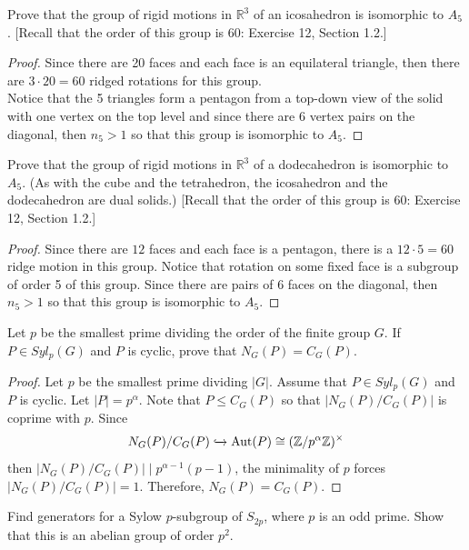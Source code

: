 \documentclass{article}
\newcommand{\Z}{\mathbb{Z}}
\newenvironment{problem}[2][Problem]{\begin{trivlist}
\item[\hskip \labelsep {\bfseries #1}\hskip \labelsep {\bfseries #2.}]}{\end{trivlist}}
\DeclareMathOperator{\Aut}{Aut}
\begin{document}
\begin{problem}{42}
    Prove that the group of rigid motions in $\mathbb{R}^3$ of an icosahedron is isomorphic to $A_5$. 
    [Recall that the order of this group is 60: Exercise 12, Section 1.2.]
\end{problem}
\begin{proof}
    Since there are 20 faces and each face is an equilateral triangle, then there are $3 \cdot 20 =60$ ridged rotations for this group.\\
    Notice that the 5 triangles form a pentagon from a top-down view of the solid with one vertex on the top level and since there are 6 vertex pairs on the diagonal, then $n_5>1$ so that this group is isomorphic to $A_5$.
\end{proof}
\begin{problem}{43}
    Prove that the group of rigid motions in $\mathbb{R}^3$ of a dodecahedron is isomorphic to $A_5$. 
    (As with the cube and the tetrahedron, the icosahedron and the dodecahedron are dual solids.) 
    [Recall that the order of this group is 60: Exercise 12, Section 1.2.]
\end{problem}
\begin{proof}
    Since there are $12$ faces and each face is a pentagon, there is a $12 \cdot 5 =60$ ridge motion in this group. Notice that rotation on some fixed face is a subgroup of order 5 of this group. Since there are pairs of $6$ faces on the diagonal, then $n_5>1$ so that this group is isomorphic to $A_5$.
\end{proof}
\begin{problem}{44}
    Let $p$ be the smallest prime dividing the order of the finite group $G$. If $P \in Syl_p(G)$ and $P$ is cyclic, prove that $N_G(P) = C_G(P)$.
\end{problem}
\begin{proof}
    Let $p$ be the smallest prime dividing $|G|$. Assume that $P\in Syl_p(G)$ and $P$ is cyclic. Let $|P|=p^{\alpha}$. Note that $P\leq C_G(P)$ so that $|N_G(P)/C_G(P)|$ is coprime with $p$. Since 
    \[
        N_G(P)/C_G(P) \xhookrightarrow{} \Aut(P) \cong (\Z/p^{\alpha}\Z)^{\times}
    \]
    then $|N_G(P)/C_G(P)| \mid p^{\alpha-1}(p-1)$, the minimality of $p$ forces $|N_G(P)/C_G(P)|=1$. Therefore, $N_G(P)=C_G(P)$.
\end{proof}
\begin{problem}{45}
    Find generators for a Sylow $p$-subgroup of $S_{2p}$, where $p$ is an odd prime. Show that this is an abelian group of order $p^2$.
\end{problem}
\end{document}
